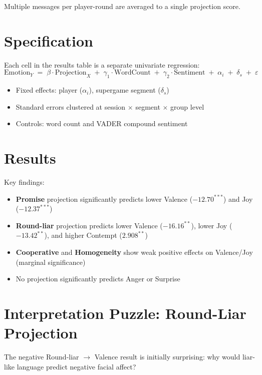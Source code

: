 \documentclass[11pt]{article}
\begin{document}
Multiple messages per player-round are averaged to a single projection score.

\section{Specification}

Each cell in the results table is a separate univariate regression:
\begin{equation*}
    \text{Emotion}_Y \;=\; \beta \cdot \text{Projection}_X \;+\; \gamma_1 \cdot \text{WordCount} \;+\; \gamma_2 \cdot \text{Sentiment} \;+\; \alpha_i \;+\; \delta_s \;+\; \varepsilon
\end{equation*}

\begin{itemize}[nosep]
    \item Fixed effects: player ($\alpha_i$), supergame segment ($\delta_s$)
    \item Standard errors clustered at session $\times$ segment $\times$ group level
    \item Controls: word count and VADER compound sentiment
\end{itemize}

\section{Results}



\medskip
Key findings:
\begin{itemize}[nosep]
    \item \textbf{Promise} projection significantly predicts lower Valence ($-12.70^{***}$) and Joy ($-12.37^{***}$)
    \item \textbf{Round-liar} projection predicts lower Valence ($-16.16^{**}$), lower Joy ($-13.42^{**}$), and higher Contempt ($2.908^{**}$)
    \item \textbf{Cooperative} and \textbf{Homogeneity} show weak positive effects on Valence/Joy (marginal significance)
    \item No projection significantly predicts Anger or Surprise
\end{itemize}

\section{Interpretation Puzzle: Round-Liar Projection}

The negative Round-liar $\rightarrow$ Valence result is initially surprising: why would liar-like language predict negative facial affect?
\end{document}
